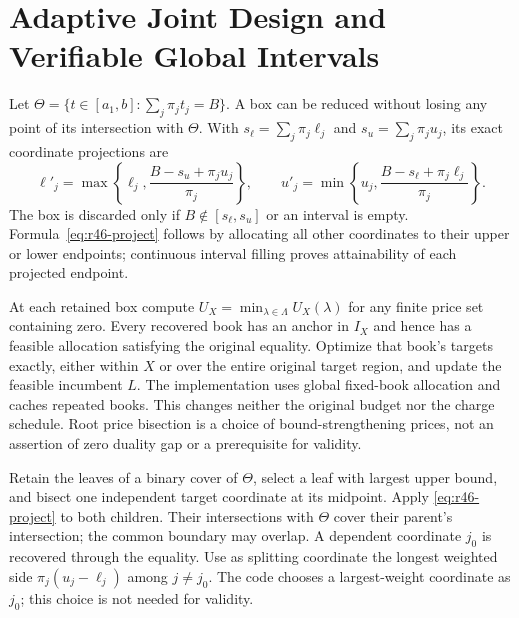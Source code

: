 \section{Adaptive Joint Design and Verifiable Global Intervals}\label{sec:r46-adaptive}
Let $\Theta=\{t\in[a_1,b]:\sum_j\pi_jt_j=B\}$. A box can be reduced without losing any point of its intersection with $\Theta$. With $s_\ell=\sum_j\pi_j\ell_j$ and $s_u=\sum_j\pi_ju_j$, its exact coordinate projections are
\begin{equation}\label{eq:r46-project}
 \ell'_j=\max\left\{\ell_j,\frac{B-s_u+\pi_ju_j}{\pi_j}\right\},\qquad
 u'_j=\min\left\{u_j,\frac{B-s_\ell+\pi_j\ell_j}{\pi_j}\right\}.
\end{equation}
The box is discarded only if $B\notin[s_\ell,s_u]$ or an interval is empty. Formula~\eqref{eq:r46-project} follows by allocating all other coordinates to their upper or lower endpoints; continuous interval filling proves attainability of each projected endpoint.

At each retained box compute $U_X=\min_{\lambda\in\Lambda}U_X(\lambda)$ for any finite price set containing zero. Every recovered book has an anchor in $I_X$ and hence has a feasible allocation satisfying the original equality. Optimize that book's targets exactly, either within $X$ or over the entire original target region, and update the feasible incumbent $L$. The implementation uses global fixed-book allocation and caches repeated books. This changes neither the original budget nor the charge schedule. Root price bisection is a choice of bound-strengthening prices, not an assertion of zero duality gap or a prerequisite for validity.

Retain the leaves of a binary cover of $\Theta$, select a leaf with largest upper bound, and bisect one independent target coordinate at its midpoint. Apply \eqref{eq:r46-project} to both children. Their intersections with $\Theta$ cover their parent's intersection; the common boundary may overlap. A dependent coordinate $j_0$ is recovered through the equality. Use as splitting coordinate the longest weighted side $\pi_j(u_j-\ell_j)$ among $j\ne j_0$. The code chooses a largest-weight coordinate as $j_0$; this choice is not needed for validity.

